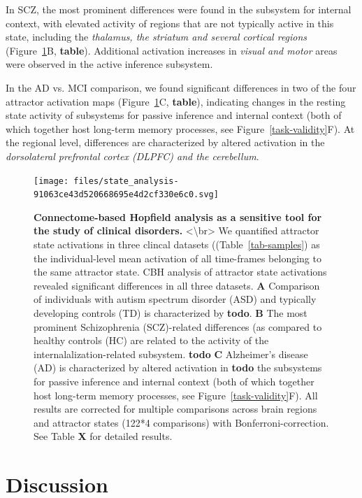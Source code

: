 \documentclass{article}
\begin{document}
In SCZ, the most prominent differences were found in the subsystem for internal context, with elevated activity of regions that are not typically active in this state, including the \textit{thalamus, the striatum and several cortical regions} (Figure~\ref{clinical-validity}B, \textbf{table}). Additional activation increases in \textit{visual and motor} areas were observed in the active inference subsystem.

In the AD vs. MCI comparison, we found significant differences in two of the four attractor activation maps (Figure~\ref{clinical-validity}C, \textbf{table}), indicating changes in the resting state activity of subsystems for passive inference and internal context (both of which together host long-term memory processes, see Figure~\ref{task-validity}F). At the regional level, differences are characterized by altered activation in the \textit{dorsolateral prefrontal cortex (DLPFC) and the cerebellum}.

\begin{figure}[!htbp]
\centering
\texttt{[image: files/state\_analysis-91063ce43d520668695e4d2cf330e6c0.svg]}
\caption[]{\textbf{Connectome-based Hopfield analysis as a sensitive tool for the study of clinical disorders.} \newline
\textless {\textbackslash}br\textgreater 
We quantified attractor state activations in three clincal datasets ((Table~\ref{tab-samples}) as the individual-level mean activation of all time-frames belonging to the same attractor state.
CBH analysis of attractor state activations revealed significant differences in all three datasets.
\textbf{A} Comparison of individuals with autism spectrum disorder (ASD) and typically developing controls (TD) is characterized by \textbf{todo}.
\textbf{B} The most prominent Schizophrenia (SCZ)-related differences (as compared to healthy controls (HC) are related to the activity of the internalalization-related subsystem. \textbf{todo}
\textbf{C} Alzheimer's disease (AD) is characterized by altered activation in \textbf{todo} the subsystems for passive inference and internal context (both of which together host long-term memory processes, see Figure~\ref{task-validity}F). All results are corrected for multiple comparisons across brain regions and attractor states (122*4 comparisons) with Bonferroni-correction. See Table \textbf{X} for detailed results.}
\label{clinical-validity}
\end{figure}

\section{Discussion}\label{Discussion}
\end{document}

